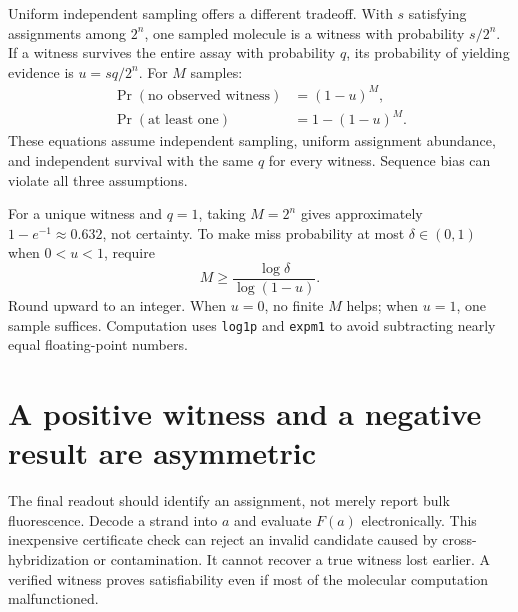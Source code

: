 Uniform independent sampling offers a different tradeoff. With $s$
satisfying assignments among $2^n$, one sampled molecule is a witness with
probability $s/2^n$. If a witness survives the entire assay with probability
$q$, its probability of yielding evidence is $u=sq/2^n$. For $M$ samples:
\begin{align}
 \Pr(\text{no observed witness})&=(1-u)^M,\\
 \Pr(\text{at least one})&=1-(1-u)^M.
 \label{eq:coverage}
\end{align}
These equations assume independent sampling, uniform assignment abundance,
and independent survival with the same $q$ for every witness. Sequence bias
can violate all three assumptions.


For a unique witness and $q=1$, taking $M=2^n$ gives approximately
$1-e^{-1}\approx0.632$, not certainty. To make miss probability at most
$\delta\in(0,1)$ when $0<u<1$, require
\begin{equation}
 M\geq\frac{\log\delta}{\log(1-u)}.
\end{equation}
Round upward to an integer. When $u=0$, no finite $M$ helps; when $u=1$,
one sample suffices. Computation uses \texttt{log1p} and \texttt{expm1}
to avoid subtracting nearly equal floating-point numbers.

\section{A positive witness and a negative result are asymmetric}
The final readout should identify an assignment, not merely report bulk
fluorescence. Decode a strand into $a$ and evaluate $F(a)$ electronically.
This inexpensive certificate check can reject an invalid candidate caused
by cross-hybridization or contamination. It cannot recover a true witness
lost earlier. A verified witness proves satisfiability even if most of the
molecular computation malfunctioned.


